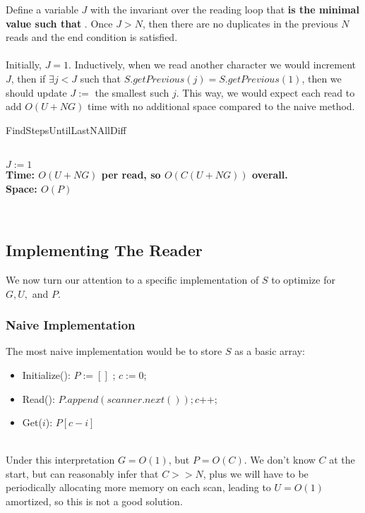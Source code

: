 \documentclass[12pt]{article}
\begin{document}
Define a variable $J$ with the invariant over the reading loop that \textbf{ is the minimal value such that }. Once $J > N$, then there are no duplicates in the previous $N$ reads and the end condition is satisfied.\\
\\
Initially, $J=1$. Inductively, when we read another character we would increment $J$, then if $\exists j<J$ such that $S.getPrevious(j) = S.getPrevious(1)$, then we should update $J :=$ the smallest such $j$. This way, we would expect each read to add $O(U + NG)$ time with no additional space compared to the naive method.\\


\begin{algorithm}[H]
\caption{FindStepsUntilLastNAllDiff}
\hrulefill \\
\nl $J := 1$\;
\nl {}
\nl {}\;
\hrulefill\\
\bf{Time:} \textnormal{$O(U+NG)$ per read, so $O(C(U + NG))$ overall.} \\
\bf{Space:} $O(P)$ 
\end{algorithm}\\

\pagebreak
\subsection{Implementing The Reader}
We now turn our attention to a specific implementation of $S$ to optimize for $G, U,$ and $P$.
\subsubsection{Naive Implementation}
\noindent The most naive implementation would be to store $S$ as a basic array:
\begin{itemize}
    \item Initialize(): $P := []$ ; $c := 0$;
    \item Read(): $P.append(scanner.next()); c$++;
    \item Get($i$): $P[c-i]$
\end{itemize}
\\
\noindent Under this interpretation $G = O(1)$, but $P = O(C)$. We don't know $C$ at the start, but can reasonably infer that $C >> N$, plus we will have to be periodically allocating more memory on each scan, leading to $U = O(1)$ amortized, so this is not a good solution. 
\end{document}
